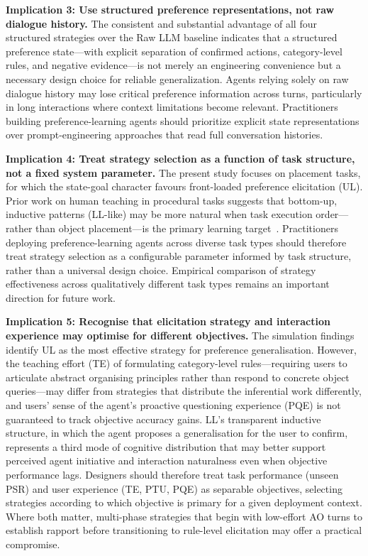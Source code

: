 \documentclass[manuscript,review,anonymous]{acmart}
\begin{document}
{\textbf{Implication 3: Use structured preference representations, not raw dialogue history.} The consistent and substantial advantage of all four structured strategies over the Raw LLM baseline indicates that a structured preference state---with explicit separation of confirmed actions, category-level rules, and negative evidence---is not merely an engineering convenience but a necessary design choice for reliable generalization. Agents relying solely on raw dialogue history may lose critical preference information across turns, particularly in long interactions where context limitations become relevant. Practitioners building preference-learning agents should prioritize explicit state representations over prompt-engineering approaches that read full conversation histories.

\textbf{Implication 4: Treat strategy selection as a function of task structure, not a fixed system parameter.} The present study focuses on placement tasks, for which the state-goal character favours front-loaded preference elicitation (UL). Prior work on human teaching in procedural tasks suggests that bottom-up, inductive patterns (LL-like) may be more natural when task execution order---rather than object placement---is the primary learning target~\cite{dai2024think,racca2018active}. Practitioners deploying preference-learning agents across diverse task types should therefore treat strategy selection as a configurable parameter informed by task structure, rather than a universal design choice. Empirical comparison of strategy effectiveness across qualitatively different task types remains an important direction for future work.

\textbf{Implication 5: Recognise that elicitation strategy and interaction experience may optimise for different objectives.} The simulation findings identify UL as the most effective strategy for preference generalisation. However, the teaching effort (TE) of formulating category-level rules---requiring users to articulate abstract organising principles rather than respond to concrete object queries---may differ from strategies that distribute the inferential work differently, and users' sense of the agent's proactive questioning experience (PQE) is not guaranteed to track objective accuracy gains. LL's transparent inductive structure, in which the agent proposes a generalisation for the user to confirm, represents a third mode of cognitive distribution that may better support perceived agent initiative and interaction naturalness even when objective performance lags. Designers should therefore treat task performance (unseen PSR) and user experience (TE, PTU, PQE) as separable objectives, selecting strategies according to which objective is primary for a given deployment context. Where both matter, multi-phase strategies that begin with low-effort AO turns to establish rapport before transitioning to rule-level elicitation may offer a practical compromise.

}
\end{document}
